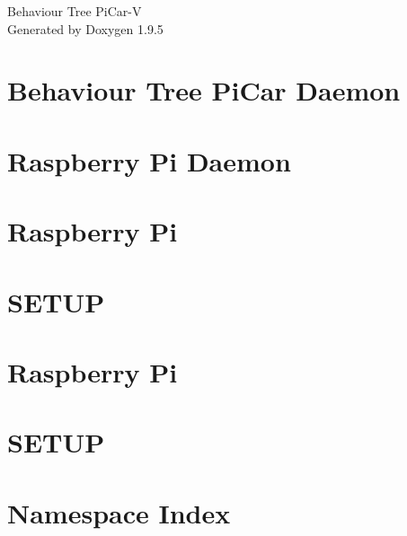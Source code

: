 \documentclass[twoside]{book}
\newcommand{\+}{\discretionary{\mbox{\scriptsize$\hookleftarrow$}}{}{}}
\newcommand{\clearemptydoublepage}{%
    \newpage{\pagestyle{empty}\cleardoublepage}%
  }
\begin{document}
  \raggedbottom
    \hypersetup{pageanchor=false,
                bookmarksnumbered=true,
                pdfencoding=unicode
               }
  \begin{titlepage}
  \vspace*{7cm}
  \begin{center}%
  {\Large Behaviour Tree Pi\+Car-\/V}\\
  \vspace*{1cm}
  {\large Generated by Doxygen 1.9.5}\\
  \end{center}
  \end{titlepage}
  \clearemptydoublepage
  \tableofcontents
  \clearemptydoublepage
  \hypersetup{pageanchor=true}
\chapter{Behaviour Tree Pi\+Car Daemon}
\label{md_daemon_install_README}

\chapter{Raspberry Pi Daemon}
\label{md_daemon_README}

\chapter{Raspberry Pi}
\label{md_README}

\chapter{SETUP}
\label{md_SETUP}

\chapter{Raspberry Pi}
\label{md_tui_README}

\chapter{SETUP}
\label{md_tui_SETUP}

\chapter{Namespace Index}

\end{document}
